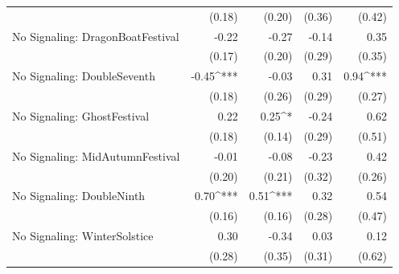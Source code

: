 \begin{table}
\begin{center}
\begin{tabular}{l D{.}{.}{6.5} D{.}{.}{6.5} D{.}{.}{6.5} D{.}{.}{6.5}}
                                                     & (0.18)                  & (0.20)                  & (0.36)                  & (0.42)                  \\
No Signaling: DragonBoatFestival                     & -0.22                   & -0.27                   & -0.14                   & 0.35                    \\
                                                     & (0.17)                  & (0.20)                  & (0.29)                  & (0.35)                  \\
No Signaling: DoubleSeventh                          & -0.45^{***}             & -0.03                   & 0.31                    & 0.94^{***}              \\
                                                     & (0.18)                  & (0.26)                  & (0.29)                  & (0.27)                  \\
No Signaling: GhostFestival                          & 0.22                    & 0.25^{*}                & -0.24                   & 0.62                    \\
                                                     & (0.18)                  & (0.14)                  & (0.29)                  & (0.51)                  \\
No Signaling: MidAutumnFestival                      & -0.01                   & -0.08                   & -0.23                   & 0.42                    \\
                                                     & (0.20)                  & (0.21)                  & (0.32)                  & (0.26)                  \\
No Signaling: DoubleNinth                            & 0.70^{***}              & 0.51^{***}              & 0.32                    & 0.54                    \\
                                                     & (0.16)                  & (0.16)                  & (0.28)                  & (0.47)                  \\
No Signaling: WinterSolstice                         & 0.30                    & -0.34                   & 0.03                    & 0.12                    \\
                                                     & (0.28)                  & (0.35)                  & (0.31)                  & (0.62)                  \\

\end{tabular}
\end{center}
\end{table}
